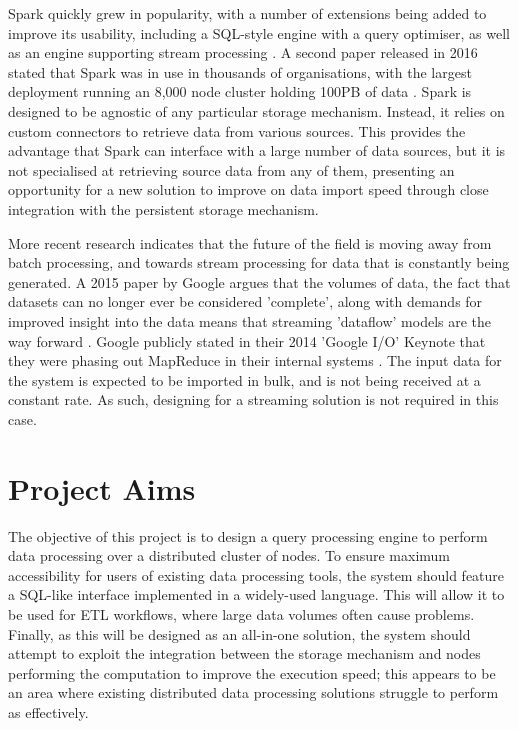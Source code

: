 Spark quickly grew in popularity, with a number of extensions being added to improve its usability, including a SQL-style engine with a query optimiser, as well as an engine supporting stream processing \cite{armbrust2015sparksql, armbrust2018sparkstreaming}. A second paper released in 2016 stated that Spark was in use in thousands of organisations, with the largest deployment running an 8,000 node cluster holding 100PB of data \cite{zaharia2016spark}. Spark is designed to be agnostic of any particular storage mechanism. Instead, it relies on custom connectors to retrieve data from various sources. This provides the advantage that Spark can interface with a large number of data sources, but it is not specialised at retrieving source data from any of them, presenting an opportunity for a new solution to improve on data import speed through close integration with the persistent storage mechanism.

More recent research indicates that the future of the field is moving away from batch processing, and towards stream processing for data that is constantly being generated. A 2015 paper by Google argues that the volumes of data, the fact that datasets can no longer ever be considered 'complete', along with demands for improved insight into the data means that streaming 'dataflow' models are the way forward  \cite{akidau2015dataflow}. Google publicly stated in their 2014 'Google I/O' Keynote that they were phasing out MapReduce in their internal systems \cite{googleio2014}. The input data for the system is expected to be imported in bulk, and is not being received at a constant rate. As such, designing for a streaming solution is not required in this case.

\section{Project Aims} 
The objective of this project is to design a query processing engine to perform data processing over a distributed cluster of nodes. To ensure maximum accessibility for users of existing data processing tools, the system should feature a SQL-like interface implemented in a widely-used language. This will allow it to be used for ETL workflows, where large data volumes often cause problems. Finally, as this will be designed as an all-in-one solution, the system should attempt to exploit the integration between the storage mechanism and nodes performing the computation to improve the execution speed; this appears to be an area where existing distributed data processing solutions struggle to perform as effectively.


